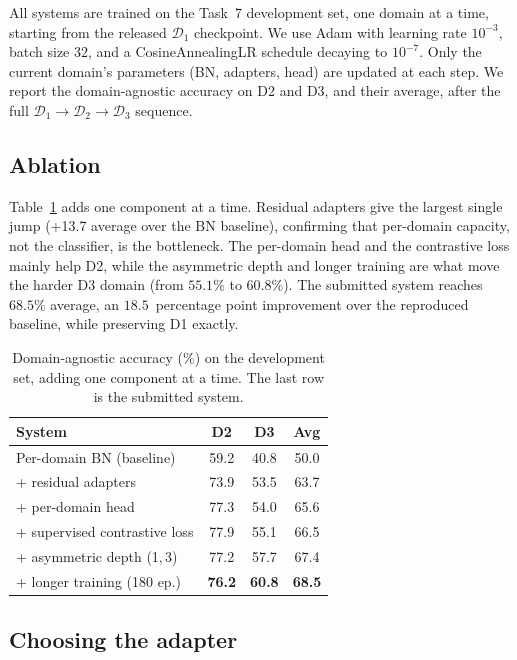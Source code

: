 \documentclass{article}
\begin{document}
\begin{sloppy}
All systems are trained on the Task~7 development set, one domain at a time,
starting from the released $\mathcal{D}_1$ checkpoint. We use Adam with
learning rate $10^{-3}$, batch size $32$, and a CosineAnnealingLR schedule
decaying to $10^{-7}$. Only the current domain's parameters (BN, adapters,
head) are updated at each step. We report the domain-agnostic accuracy on
D2 and D3, and their average, after the full $\mathcal{D}_1\!\rightarrow\!
\mathcal{D}_2\!\rightarrow\!\mathcal{D}_3$ sequence.

\subsection{Ablation}
\label{ssec:ablation}

Table~\ref{tab:ablation} adds one component at a time. Residual adapters give
the largest single jump (+13.7 average over the BN baseline), confirming that
per-domain capacity, not the classifier, is the bottleneck. The per-domain
head and the contrastive loss mainly help D2, while the asymmetric depth and
longer training are what move the harder D3 domain (from $55.1\%$ to
$60.8\%$). The submitted system reaches $68.5\%$ average, an $18.5$~percentage
point improvement over the reproduced baseline, while preserving D1 exactly.

\begin{table}[t]
  \centering
  \caption{Domain-agnostic accuracy ($\%$) on the development set, adding one
           component at a time. The last row is the submitted system.}
  \label{tab:ablation}
  \begin{tabularx}{\columnwidth}{Xccc}
    \toprule
    System & D2 & D3 & Avg \\
    \midrule
    Per-domain BN (baseline) \cite{mulimani2025dil} & 59.2 & 40.8 & 50.0 \\
    \;+ residual adapters            & 73.9 & 53.5 & 63.7 \\
    \;+ per-domain head              & 77.3 & 54.0 & 65.6 \\
    \;+ supervised contrastive loss  & 77.9 & 55.1 & 66.5 \\
    \;+ asymmetric depth (1,\,3)     & 77.2 & 57.7 & 67.4 \\
    \;+ longer training (180 ep.)    & \textbf{76.2} & \textbf{60.8} & \textbf{68.5} \\
    \bottomrule
  \end{tabularx}
\end{table}

\subsection{Choosing the adapter}
\label{ssec:adapter_choice}


\end{sloppy}
\end{document}
